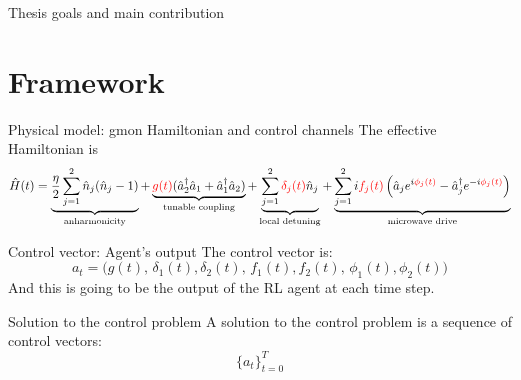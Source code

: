\documentclass{beamer}
\newcommand{\presenterbox}[1]{%
\begin{tikzpicture}[remember picture,overlay]
    \node[anchor=south east, xshift=-0.0cm, yshift=0.3cm] at (current page.south east) {%
        \tikz{\node[fill=blue!80, rounded corners=3pt, inner sep=3pt]{\color{white}\small\bfseries #1};}%
    };
\end{tikzpicture}%
}
\newcommand{\ctrl}[1]{\textcolor{red}{#1}}
\begin{document}
\begin{frame}{Thesis goals and main contribution}
\let\thefootnote\relax{}
\end{frame}

\section{Framework}

\begin{frame}{Physical model: gmon Hamiltonian and control channels}
\small
The effective Hamiltonian is
\vspace{-1ex}
{\scriptsize
\[
    \hat{H}(t) =
    \underbrace{\frac{\eta}{2}\sum_{j=1}^{2}\hat{n}_{j}(\hat{n}_{j}-1)}_{\text{anharmonicity}}
    + \underbrace{\ctrl{g(t)}(\hat{a}_{2}^{\dagger}\hat{a}_{1}+\hat{a}_{1}^{\dagger}\hat{a}_{2})}_{\text{tunable coupling}}
    + \underbrace{\sum_{j=1}^{2}\ctrl{\delta_{j}(t)}\hat{n}_{j}}_{\text{local detuning}}
    + \underbrace{\sum_{j=1}^{2} i \ctrl{f_{j}(t)}
    \left(
    \hat{a}_{j}e^{i\ctrl{\phi_{j}(t)}}-\hat{a}_{j}^{\dagger}e^{-i\ctrl{\phi_{j}(t)}}
    \right)}_{\text{microwave drive}}
\]}
\vspace{-1ex}


\begin{block}{Control vector: Agent's output}
The control vector is:
\textbf{\[
a_t=
\bigl(
g(t),\,
\delta_1(t),\delta_2(t),\,
f_1(t),f_2(t),\,
\phi_1(t),\phi_2(t)
\bigr)
\]}
And this is going to be the output of the RL agent at each time step.
\end{block}
\begin{alertblock}{Solution to the control problem}
A solution to the control problem is a sequence of control vectors: \textbf {\[\{a_t\}_{t=0}^T\]} 
\end{alertblock}




\end{frame}
\end{document}
